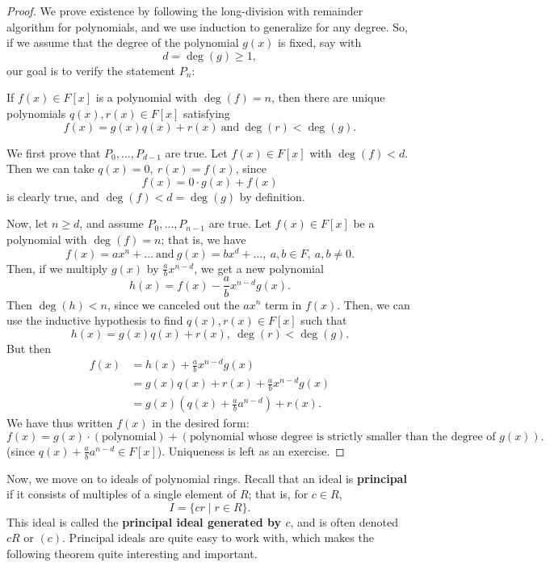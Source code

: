 \documentclass[math1530-lecture-notes]{subfiles}
\begin{document}
\begin{proof}[Proof]
  We prove existence by following the long-division with remainder algorithm for polynomials, and
  we use induction to generalize for any degree. So, if we assume that the degree of the polynomial
  $g(x)$ is fixed, say with \[
    d = \deg(g)\ge 1
  ,\] our goal is to verify the statement $P_n$: \begin{center}
  If $f(x)\in F[x]$ is a polynomial with $\deg(f)=n$, then there are unique polynomials
  $q(x),r(x)\in F[x]$ satisfying \[
    f(x)=g(x)q(x)+r(x) ~\text{and}~ \deg(r) < \deg(g).\]
  \end{center}

  We first prove that $P_0,\ldots,P_{d-1}$ are true. Let $f(x)\in F[x]$ with $\deg(f) < d$. Then
  we can take $q(x)=0,\ r(x)=f(x)$, since \[
    f(x)=0\cdot g(x)+f(x)
  \] is clearly true, and $\deg(f)<d=\deg(g)$ by definition.
  
  Now, let $n\ge d$, and assume $P_0,\ldots, P_{n-1}$ are true. Let $f(x)\in F[x]$ be a polynomial
  with $\deg(f)=n$; that is, we have \[
    f(x)=ax^n+\ldots ~\text{and}~ g(x)=bx^d+\ldots,\ a,b\in F,\ a,b\neq 0
  .\] Then, if we multiply $g(x)$ by $\frac{a}{b}x^{n-d}$, we get a new polynomial \[
    h(x)=f(x)-\frac{a}{b}x^{n-d}g(x)
  .\] Then $\deg(h)<n$, since we canceled out the $ax^n$ term in $f(x)$. Then, we can use the
  inductive hypothesis to find $q(x),r(x)\in F[x]$ such that \[
    h(x)=g(x)q(x)+r(x),\ \deg(r)<\deg(g)
  .\] But then
  \begin{align*}
    f(x) &= h(x)+\frac{a}{b}x^{n-d}g(x)\\
         &=g(x)q(x)+r(x)+\frac{a}{b}x^{n-d}g(x)\\
         &=g(x)(q(x)+\frac{a}{b}a^{n-d})+r(x)
       .\end{align*}
   We have thus written $f(x)$ in the desired form: \[
     f(x)=g(x)\cdot \left( \text{polynomial} \right) +\left( \text{polynomial whose degree is
     strictly smaller than the degree of $g(x)$} \right) 
   .\] (since $q(x)+\frac{a}{b}a^{n-d}\in F[x]$). Uniqueness is left as an exercise.
\end{proof}

Now, we move on to ideals of polynomial rings. Recall that an ideal is \textbf{principal} if it
consists of multiples of a single element of $R$; that is, for $c\in R$, \[
  I = \{cr\mid r\in R\} 
.\] This ideal is called the \textbf{principal ideal generated by $c$}, and is often denoted $cR$ or
$(c)$. Principal ideals are quite easy to work with, which makes the following theorem quite
interesting and important.
\end{document}
